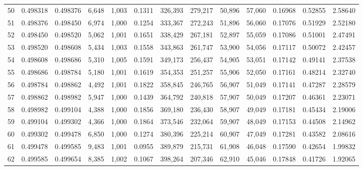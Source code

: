 \begin{tabular}{rrrrrrrrrrrrr}
50  &  0.498318 &  0.498376 &  6,648 &  1,003 &                                     0.1311 &  326,393 &  279,217 &   50,896 &   57,060 &  0.16968 &  0.52855 &  2.58640 \\
51  &  0.498376 &  0.498450 &  6,974 &  1,000 &                                     0.1254 &  333,367 &  272,243 &   51,896 &   56,060 &  0.17076 &  0.51929 &  2.52180 \\
52  &  0.498450 &  0.498520 &  5,062 &  1,001 &                                     0.1651 &  338,429 &  267,181 &   52,897 &   55,059 &  0.17086 &  0.51001 &  2.47491 \\
53  &  0.498520 &  0.498608 &  5,434 &  1,003 &                                     0.1558 &  343,863 &  261,747 &   53,900 &   54,056 &  0.17117 &  0.50072 &  2.42457 \\
54  &  0.498608 &  0.498686 &  5,310 &  1,005 &                                     0.1591 &  349,173 &  256,437 &   54,905 &   53,051 &  0.17142 &  0.49141 &  2.37538 \\
55  &  0.498686 &  0.498784 &  5,180 &  1,001 &                                     0.1619 &  354,353 &  251,257 &   55,906 &   52,050 &  0.17161 &  0.48214 &  2.32740 \\
56  &  0.498784 &  0.498862 &  4,492 &  1,001 &                                     0.1822 &  358,845 &  246,765 &   56,907 &   51,049 &  0.17141 &  0.47287 &  2.28579 \\
57  &  0.498862 &  0.498982 &  5,947 &  1,000 &                                     0.1439 &  364,792 &  240,818 &   57,907 &   50,049 &  0.17207 &  0.46361 &  2.23071 \\
58  &  0.498982 &  0.499104 &  4,388 &  1,000 &                                     0.1856 &  369,180 &  236,430 &   58,907 &   49,049 &  0.17181 &  0.45434 &  2.19006 \\
59  &  0.499104 &  0.499302 &  4,366 &  1,000 &                                     0.1864 &  373,546 &  232,064 &   59,907 &   48,049 &  0.17153 &  0.44508 &  2.14962 \\
60  &  0.499302 &  0.499478 &  6,850 &  1,000 &                                     0.1274 &  380,396 &  225,214 &   60,907 &   47,049 &  0.17281 &  0.43582 &  2.08616 \\
61  &  0.499478 &  0.499585 &  9,483 &  1,001 &                                     0.0955 &  389,879 &  215,731 &   61,908 &   46,048 &  0.17590 &  0.42654 &  1.99832 \\
62  &  0.499585 &  0.499654 &  8,385 &  1,002 &                                     0.1067 &  398,264 &  207,346 &   62,910 &   45,046 &  0.17848 &  0.41726 &  1.92065 \\

\end{tabular}
